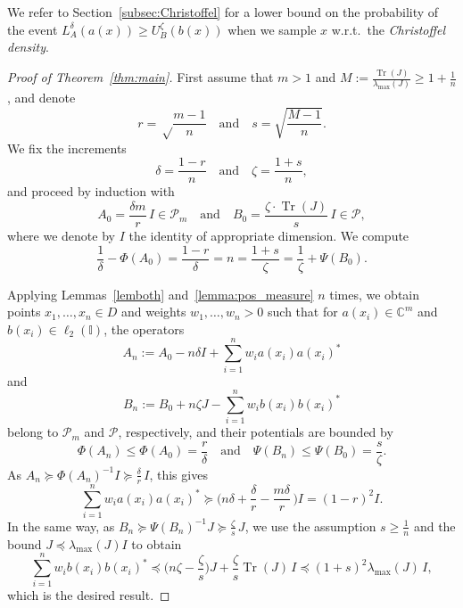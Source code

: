 \documentclass[a4paper,11pt]{article}
\renewcommand{\(}{\left (}
\renewcommand{\)}{\right )}
\newcommand{\<}{\langle}
\renewcommand{\>}{\rangle}
\newcommand{\C}{\mathbb{C}}
\newcommand{\II}{\mathbb{I}}
\theoremstyle{definition}
\DeclareMathOperator{\Tr}{Tr}
\begin{document}
We refer to Section~\ref{subsec:Christoffel} for a lower bound on the 
probability of the event $L_A^\delta(a(x))\geq U_B^\zeta(b(x))$ when we sample $x$ w.r.t.~the \emph{Christoffel density}.

\medskip

\begin{proof}[Proof of Theorem~\ref{thm:main}]
First assume that $m>1$ and $M:=\frac{\Tr(J)}{\lambda_{\max}(J)}\geq 1+\frac{1}{n}$, and denote
\[
r=\sqrt\frac{m-1}{n}
\quad\text{and}\quad
s=\sqrt{\frac{M-1}{n}}.
\]
We fix the increments
\[
\delta=\frac{1-r}{n}\quad\text{and}\quad \zeta = \frac{1+s}{n},
\]
and proceed by induction with 
\begin{equation}\label{eq:initialize}
A_0=\frac{\delta m}{r}\,I \in \mathcal P_m
\quad\text{and}\quad
B_0=\frac{\zeta\cdot\Tr(J)}{s}\,I \in \mathcal P,
\end{equation}
where we denote by $I$ the identity of appropriate dimension.
We compute
\[
\frac{1}{\delta}-\Phi(A_0)=\frac{1-r}{\delta}=n
=\frac{1+s}{\zeta}=
\frac{1}{\zeta}+\Psi(B_0).
\]

Applying Lemmas~\ref{lemboth} and~\ref{lemma:pos_measure} $n$ times,
we obtain points $x_1,\hdots,x_n \in D$
and weights $w_1,\hdots,w_n >0$
such that for $a(x_i)\in\C^m$ and $b(x_i)\in \ell_2(\II)$, 
the operators 
\[
A_n:=A_0-n\delta I+\sum_{i=1}^{n} w_i a(x_i) a(x_i)^*
\]
and
\[
B_n:=B_0+n\zeta J-\sum_{i=1}^{n} w_i b(x_i) b(x_i)^*
\]
belong to $\mathcal P_m$ and $\mathcal P$, respectively, and their potentials are bounded by
\[
\Phi(A_n)\leq \Phi(A_0)=\frac{r}{\delta}\quad\text{and}\quad
\Psi(B_n)\leq \Psi(B_0)=\frac{s}{\zeta}.
\]
As
$A_n \succcurlyeq \Phi(A_n)^{-1} I \succcurlyeq \frac{\delta}{r}\, I$, this gives
\begin{equation}\label{eq:LB}
\sum_{i=1}^{n} w_i a(x_i) a(x_i)^*
\succcurlyeq \Big(n\delta+\frac{\delta}{r}-\frac{m\delta}{r}\,\Big)I = (1-r)^2I.
\end{equation}
In the same way, as $B_n \succcurlyeq  \Psi(B_n)^{-1}J \succcurlyeq \frac{\zeta}{s}\, J$, we use the assumption $s\geq\frac{1}{n}$ and the bound $J \preccurlyeq \lambda_{\max}(J) I$ to obtain
\begin{equation}\label{eq:UB}
\sum_{i=1}^{n} w_i b(x_i) b(x_i)^*
\preccurlyeq \Big(n\zeta -\frac{\zeta}{s}\Big)J+\frac{\zeta}{s}\Tr(J)\, I \preccurlyeq (1+s)^2\lambda_{\max}(J) \, I,
\end{equation}
which is the desired result.


\end{proof}
\end{document}
